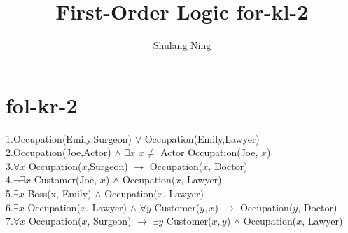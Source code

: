 \documentclass[11pt]{article}
\title{First-Order Logic for-kl-2}
\author{Shulang Ning}
\begin{document}
        
    \maketitle
    
    \section{fol-kr-2}
    1.Occupation(Emily,Surgeon) $\lor$ Occupation(Emily,Lawyer)\\
    2.Occupation(Joe,Actor) $\land$ $\exists x$ $x \neq$ Actor Occupation(Joe, $x$)\\
    3.$\forall x$ Occupation($x$,Surgeon) $\rightarrow$ Occupation($x$, Doctor)\\
    4.$\neg \exists x$ Customer(Joe, $x$) $\land$ Occupation($x$, Lawyer)\\
    5.$\exists x$ Boss(x, Emily) $\land$ Occupation($x$, Lawyer)\\
    6.$\exists x$ Occupation($x$, Lawyer) $\land$ $\forall y$ Customer($y,x$) $\rightarrow$ Occupation($y$, Doctor)\\
    7.$\forall x$ Occupation($x$, Surgeon) $\rightarrow$ $\exists y$ Customer($x,y$) $\land$ Occupation($x$, Lawyer)\\



    




    
\end{document}
